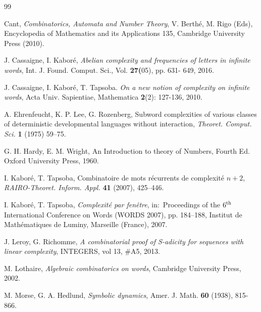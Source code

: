 \documentclass[a4 paper,12pt]{article}
\begin{document}
\begin{thebibliography}{99}

 Cant, \emph{Combinatorics, Automata and Number Theory}, V. Berth\'e, M. Rigo (Eds),
Encyclopedia of Mathematics and its Applications 135,  Cambridge University Press (2010). 
 
    J. Cassaigne, I. Kabor\'e, \textit{Abelian complexity and frequencies of letters in infinite words}, Int. J. Found. Comput. Sci., Vol. \textbf{27(}05), pp. 631- 649, 2016.

 J. Cassaigne, I. Kabor\'e, T. Tapsoba. \emph{On a new notion of complexity on infinite words}, Acta Univ. Sapientiae, Mathematica \textbf{2}(2): 127-136, 2010.




 A. Ehrenfeucht, K. P. Lee, G. Rozenberg, Subword complexities of various classes of deterministic developmental languages without interaction, \textit{Theoret. Comput. Sci.} \textbf{1} (1975) 59--75.

 G. H. Hardy, E. M. Wright, An Introduction to theory of Numbers, Fourth Ed. Oxford University Press, 1960.

I. Kabor\'e, T. Tapsoba, Combinatoire de mots r\'ecurrents de complexit\'e $n+2$, \textit{RAIRO-Theoret. Inform. Appl.} \textbf{41} (2007), 425--446.

 I. Kabor\'e, T. Tapsoba, \textit{Complexit\'e par fen\^etre}, in:\ Proceedings of the $6^{\rm th}$ International Conference on Words (WORDS 2007), pp. 184--188, Institut de Math\'ematiques de Luminy, Marseille (France), 2007.



 J. Leroy, G. Richomme, \emph{A combinatorial proof of S-adicity for sequences with linear complexity}, INTEGERS, vol 13,  \#A5, 2013. 

 M. Lothaire, \textit{Algebraic combinatorics on words}, Cambridge University Press, 2002.

 M. Morse, G. A. Hedlund, \emph{Symbolic dynamics}, Amer. J. Math. \textbf{60} (1938), 815-866.



\end{thebibliography}
\end{document}
